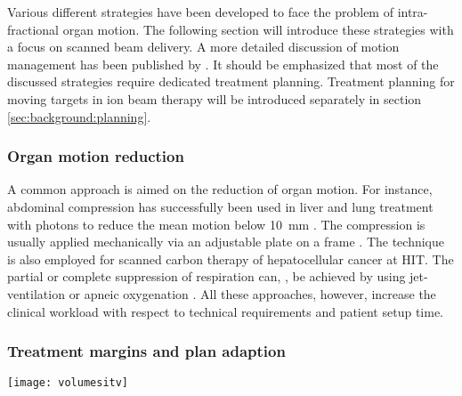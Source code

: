 Various different strategies have been developed to face the problem
of intra-fractional organ motion. The following section will introduce
these strategies with a focus on scanned beam delivery. A more
detailed discussion of motion management has been published by
\citet{Bert2011}. It should be emphasized that most of the discussed
strategies require dedicated treatment planning. Treatment planning
for moving targets in ion beam therapy will be introduced separately
in section \ref{sec:background:planning}.

\subsubsection{Organ motion reduction}
A common approach is aimed on the reduction of organ motion. For
instance, abdominal compression has successfully been used in liver
and lung treatment with photons to reduce the mean motion below
\SI{10}{\milli\meter} \citep{Negoro2001,Hof2003}. The compression is
usually applied mechanically via an adjustable plate on a frame
\citep{Eccles2011}. The technique is also employed for scanned
carbon therapy of hepatocellular cancer at HIT. The partial or
complete suppression of respiration can, \eg, be achieved by using
jet-ventilation \citep{Hof2003} or apneic oxygenation
\citep{RPTC2011}. All these approaches, however, increase the clinical
workload with respect to technical requirements and patient setup
time.


\subsubsection{Treatment margins and plan adaption}
\label{sec:background:margins}
%
%
\begin{SCfigure}[1.8][tbp]
  \centering
  \parbox{0.4\textwidth}{\centering\texttt{[image: volumesitv]}}
  \caption[\acl{ITV} formation.]{The \acf{CTV} encompasses the
    \acf{GTV}, including possible microscopic tumor spread. The
    \acf{ITV} is formed from the union of \ac{CTV} contours throughout
    the full motion cycle. \ac{PTV} margins take into account
    geometrical uncertainties and avoidance of organs at risk
    (\acsp{OAR}).}
  \label{fig:background:volumesitv}
\end{SCfigure}

